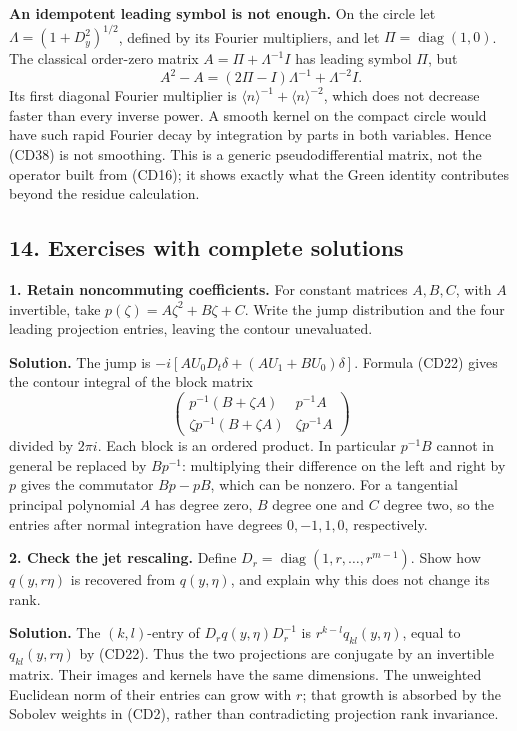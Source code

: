 \documentclass[
  11pt,
]{article}
\begin{document}
\textbf{An idempotent leading symbol is not enough.} On the circle let
\(\Lambda=(1+D_y^2)^{1/2}\), defined by its Fourier multipliers, and let
\(\Pi=\operatorname{diag}(1,0)\). The classical order-zero matrix
\(A=\Pi+\Lambda^{-1}I\) has leading symbol \(\Pi\), but \[
A^2-A=(2\Pi-I)\Lambda^{-1}+\Lambda^{-2}I.
\tag{CD38}
\] Its first diagonal Fourier multiplier is
\(\langle n\rangle^{-1}+\langle n\rangle^{-2}\), which does not decrease
faster than every inverse power. A smooth kernel on the compact circle
would have such rapid Fourier decay by integration by parts in both
variables. Hence (CD38) is not smoothing. This is a generic
pseudodifferential matrix, not the operator built from (CD16); it shows
exactly what the Green identity contributes beyond the residue
calculation.

\subsection{14. Exercises with complete
solutions}\label{exercises-with-complete-solutions}

\textbf{1. Retain noncommuting coefficients.} For constant matrices
\(A,B,C\), with \(A\) invertible, take \(p(\zeta)=A\zeta^2+B\zeta+C\).
Write the jump distribution and the four leading projection entries,
leaving the contour unevaluated.

\textbf{Solution.} The jump is \(-i[AU_0D_t\delta+(AU_1+BU_0)\delta]\).
Formula (CD22) gives the contour integral of the block matrix \[
\begin{pmatrix}
p^{-1}(B+\zeta A)&p^{-1}A\\
\zeta p^{-1}(B+\zeta A)&\zeta p^{-1}A
\end{pmatrix}
\tag{CD39}
\] divided by \(2\pi i\). Each block is an ordered product. In
particular \(p^{-1}B\) cannot in general be replaced by \(Bp^{-1}\):
multiplying their difference on the left and right by \(p\) gives the
commutator \(Bp-pB\), which can be nonzero. For a tangential principal
polynomial \(A\) has degree zero, \(B\) degree one and \(C\) degree two,
so the entries after normal integration have degrees \(0,-1,1,0\),
respectively.

\textbf{2. Check the jet rescaling.} Define
\(D_r=\operatorname{diag}(1,r,\ldots,r^{m-1})\). Show how \(q(y,r\eta)\)
is recovered from \(q(y,\eta)\), and explain why this does not change
its rank.

\textbf{Solution.} The \((k,l)\)-entry of \(D_rq(y,\eta)D_r^{-1}\) is
\(r^{k-l}q_{kl}(y,\eta)\), equal to \(q_{kl}(y,r\eta)\) by (CD22). Thus
the two projections are conjugate by an invertible matrix. Their images
and kernels have the same dimensions. The unweighted Euclidean norm of
their entries can grow with \(r\); that growth is absorbed by the
Sobolev weights in (CD2), rather than contradicting projection rank
invariance.
\end{document}
